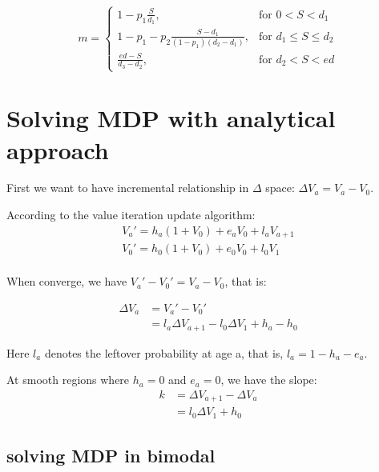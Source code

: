\documentclass[12pt, letterpaper]{article}
\begin{document}
\[
m = \left\{\begin{array}{lr}
      1-p_1\frac{S}{d_1}, & \text{for } 0 < S < d_1 \\
      1-p_1-p_2\frac{S-d_1}{(1-p_1)(d_2-d_1)}, & \text{for } d_1 \leq S \leq d_2 \\
      \frac{ed-S}{d_3-d_2}, & \text{for } d_2 < S < ed
           \end{array}
           \right.
\]

\section{Solving MDP with analytical approach}

First we want to have incremental relationship in $\Delta$ space: $\Delta V_a = V_a - V_0$.

According to the value iteration update algorithm:
\begin{equation}
\begin{aligned}
V_a' = h_a (1+V_0) + e_a V_0 + l_a V_{a+1} \\
V_0' = h_0 (1+V_0) + e_0 V_0 + l_0 V_1 \\
\end{aligned}
\end{equation}

When converge, we have $V_a' - V_0' = V_a - V_0 $, that is:

\begin{equation}
\begin{aligned}
\Delta V_a & = V_a' - V_0' \\
 & = l_a \Delta V_{a+1} - l_0 \Delta V_1 + h_a - h_0
\end{aligned}
\end{equation}

Here $l_a$ denotes the leftover probability at age a, that is, $l_a = 1- h_a -
e_a$.

At smooth regions where $h_a = 0$ and $e_a = 0$, we have the slope:
\begin{equation}
\label{eq:slope}
\begin{aligned}
k & = \Delta V_{a+1} - \Delta V_a \\
& = l_0 \Delta V_1 + h_0
\end{aligned}
\end{equation}

\subsection{solving MDP in bimodal}
\end{document}

